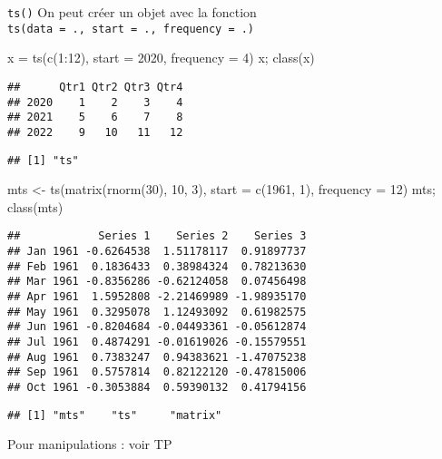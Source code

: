 \documentclass[10pt,xcolor=table,color={dvipsnames,usenames},ignorenonframetext,usepdftitle=false,french]{beamer}
\newenvironment{Shaded}{\begin{snugshade}}{\end{snugshade}}
\newcommand{\AttributeTok}[1]{\textcolor[rgb]{0.77,0.63,0.00}{#1}}
\newcommand{\DecValTok}[1]{\textcolor[rgb]{0.00,0.00,0.81}{#1}}
\newcommand{\FunctionTok}[1]{\textcolor[rgb]{0.00,0.00,0.00}{#1}}
\newcommand{\NormalTok}[1]{#1}
\newcommand{\OtherTok}[1]{\textcolor[rgb]{0.56,0.35,0.01}{#1}}
\newcommand{\SpecialCharTok}[1]{\textcolor[rgb]{0.00,0.00,0.00}{#1}}
\begin{document}
\begin{frame}{\texttt{ts()}}
\protect\hypertarget{ts-1}{}
On peut créer un objet avec la fonction
\texttt{ts(data\ =\ .,\ start\ =\ .,\ frequency\ =\ .)}

\begin{Shaded}
\begin{Highlighting}[]
\NormalTok{x }\OtherTok{=} \FunctionTok{ts}\NormalTok{(}\FunctionTok{c}\NormalTok{(}\DecValTok{1}\SpecialCharTok{:}\DecValTok{12}\NormalTok{), }\AttributeTok{start =} \DecValTok{2020}\NormalTok{, }\AttributeTok{frequency =} \DecValTok{4}\NormalTok{)}
\NormalTok{x; }\FunctionTok{class}\NormalTok{(x)}
\end{Highlighting}
\end{Shaded}

\begin{verbatim}
##      Qtr1 Qtr2 Qtr3 Qtr4
## 2020    1    2    3    4
## 2021    5    6    7    8
## 2022    9   10   11   12
\end{verbatim}

\begin{verbatim}
## [1] "ts"
\end{verbatim}

\begin{Shaded}
\begin{Highlighting}[]
\NormalTok{mts }\OtherTok{\textless{}{-}} \FunctionTok{ts}\NormalTok{(}\FunctionTok{matrix}\NormalTok{(}\FunctionTok{rnorm}\NormalTok{(}\DecValTok{30}\NormalTok{), }\DecValTok{10}\NormalTok{, }\DecValTok{3}\NormalTok{), }\AttributeTok{start =} \FunctionTok{c}\NormalTok{(}\DecValTok{1961}\NormalTok{, }\DecValTok{1}\NormalTok{),}
          \AttributeTok{frequency =} \DecValTok{12}\NormalTok{)}
\NormalTok{mts; }\FunctionTok{class}\NormalTok{(mts)}
\end{Highlighting}
\end{Shaded}

\begin{verbatim}
##            Series 1    Series 2    Series 3
## Jan 1961 -0.6264538  1.51178117  0.91897737
## Feb 1961  0.1836433  0.38984324  0.78213630
## Mar 1961 -0.8356286 -0.62124058  0.07456498
## Apr 1961  1.5952808 -2.21469989 -1.98935170
## May 1961  0.3295078  1.12493092  0.61982575
## Jun 1961 -0.8204684 -0.04493361 -0.05612874
## Jul 1961  0.4874291 -0.01619026 -0.15579551
## Aug 1961  0.7383247  0.94383621 -1.47075238
## Sep 1961  0.5757814  0.82122120 -0.47815006
## Oct 1961 -0.3053884  0.59390132  0.41794156
\end{verbatim}

\begin{verbatim}
## [1] "mts"    "ts"     "matrix"
\end{verbatim}

Pour manipulations : voir TP
\end{frame}
\end{document}
